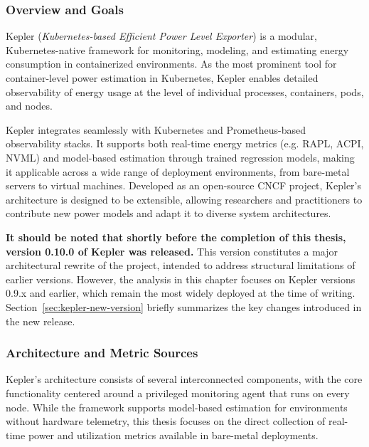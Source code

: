 \subsubsection{Overview and Goals}
\label{sec:kepler-overview}

Kepler (\textit{Kubernetes-based Efficient Power Level Exporter})\parencite{kepler_energy} is a modular, Kubernetes-native framework for monitoring, modeling, and estimating energy consumption in containerized environments. As the most prominent tool for container-level power estimation in Kubernetes, Kepler enables detailed observability of energy usage at the level of individual processes, containers, pods, and nodes\parencite{amaralKeplerFrameworkCalculate2023}.

Kepler integrates seamlessly with Kubernetes and Prometheus-based observability stacks. It supports both real-time energy metrics (e.g. RAPL, ACPI, NVML) and model-based estimation through trained regression models, making it applicable across a wide range of deployment environments, from bare-metal servers to virtual machines. Developed as an open-source CNCF project, Kepler’s architecture is designed to be extensible, allowing researchers and practitioners to contribute new power models and adapt it to diverse system architectures.

\textbf{It should be noted that shortly before the completion of this thesis, version 0.10.0 of Kepler was released.} This version constitutes a major architectural rewrite of the project, intended to address structural limitations of earlier versions. However, the analysis in this chapter focuses on Kepler versions 0.9.x and earlier, which remain the most widely deployed at the time of writing. Section~\ref{sec:kepler-new-version} briefly summarizes the key changes introduced in the new release.
\subsubsection{Architecture and Metric Sources}
\label{sec:kepler-architecture}

Kepler's architecture consists of several interconnected components, with the core functionality centered around a privileged monitoring agent that runs on every node. While the framework supports model-based estimation for environments without hardware telemetry, this thesis focuses on the direct collection of real-time power and utilization metrics available in bare-metal deployments.

